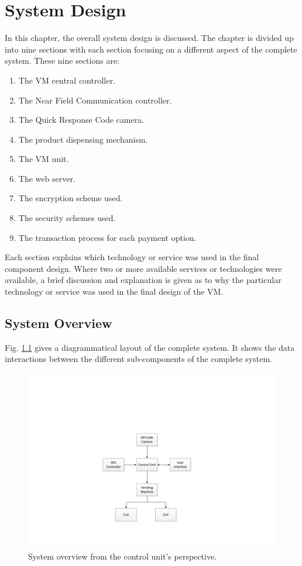 \chapter{System Design}
\label{chap:3}

In this chapter, the overall system design is discussed. The chapter is divided up into 
nine sections with each section focusing on a different aspect of the complete
system. These nine sections are:

\begin{enumerate}
  \item The VM central controller.
  \item The Near Field Communication controller.
  \item The Quick Response Code camera.
  \item The product dispensing mechanism.
  \item The VM unit.
  \item The web server.
  \item The encryption scheme used.
  \item The security schemes used. 
  \item The transaction process for each payment option. 
\end{enumerate}

Each section explains which technology or service was used in the final
component design. Where two or more available services or technologies were
available, a brief discussion and explanation is given as to why the particular
technology or service was used in the final design of the VM.

\section{System Overview}

Fig. \ref{fig:system-overview-pi} gives a diagrammatical layout of the complete system.
It shows the data interactions between the different sub-components of the complete
system.

\begin{figure}
\centering
\includegraphics[clip=true, trim = 100 90 0 200, scale=0.7]{pi_system_overview}
\caption{System overview from the control unit's perspective.}
\label{fig:system-overview-pi}
\end{figure}

